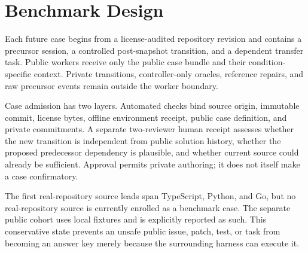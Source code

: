 \section{Benchmark Design}

Each future case begins from a license-audited repository revision and contains
a precursor session, a controlled post-snapshot transition, and a dependent
transfer task. Public workers receive only the public case bundle and their
condition-specific context. Private transitions, controller-only oracles,
reference repairs, and raw precursor events remain outside the worker boundary.

Case admission has two layers. Automated checks bind source origin, immutable
commit, license bytes, offline environment receipt, public case definition, and
private commitments. A separate two-reviewer human receipt assesses whether the
new transition is independent from public solution history, whether the proposed
predecessor dependency is plausible, and whether current source could already be
sufficient. Approval permits private authoring; it does not itself make a case
confirmatory.

The first real-repository source leads span TypeScript, Python, and Go, but no
real-repository source is currently enrolled as a benchmark case. The separate
public cohort uses local fixtures and is explicitly reported as such. This
conservative state prevents an unsafe public issue, patch, test, or task from
becoming an answer key merely because the surrounding harness can execute it.
